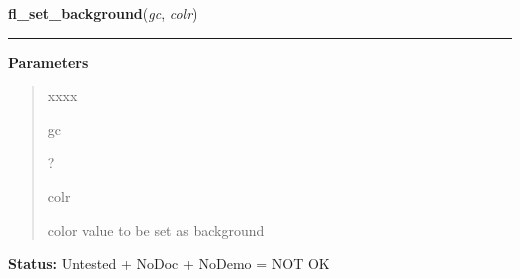 \hspace{.8\funcindent}\begin{boxedminipage}{\funcwidth}

    \raggedright \textbf{fl\_set\_background}(\textit{gc}, \textit{colr})

    \vspace{-1.5ex}

    \rule{\textwidth}{0.5\fboxrule}
\setlength{\parskip}{2ex}
\setlength{\parskip}{1ex}
      \textbf{Parameters}
      \vspace{-1ex}

      \begin{quote}
        \begin{Ventry}{xxxx}

          \item[gc]

          ?

          \item[colr]

          color value to be set as background

        \end{Ventry}

      \end{quote}

\textbf{Status:} Untested + NoDoc + NoDemo = NOT OK



    \end{boxedminipage}

    \label{xformslib:library:fl_wincreate}

    \vspace{0.5ex}

